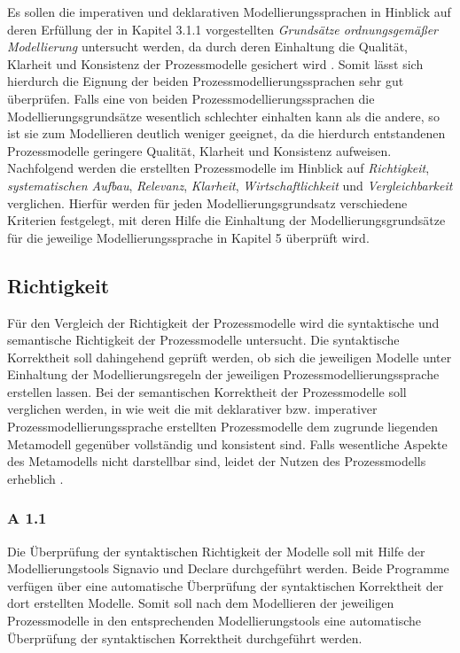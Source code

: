 Es sollen die imperativen und deklarativen Modellierungssprachen in Hinblick auf deren Erfüllung der in Kapitel 3.1.1 vorgestellten \textit{Grundsätze ordnungsgemäßer Modellierung} untersucht werden, da durch deren Einhaltung die Qualität, Klarheit und Konsistenz der Prozessmodelle gesichert wird \cite{freund2007}. Somit lässt sich hierdurch die Eignung der beiden Prozessmodellierungssprachen sehr gut überprüfen. Falls eine von beiden Prozessmodellierungssprachen die Modellierungsgrundsätze wesentlich schlechter einhalten kann als die andere, so ist sie zum Modellieren deutlich weniger geeignet, da die hierdurch entstandenen Prozessmodelle geringere Qualität, Klarheit und Konsistenz aufweisen. Nachfolgend werden die erstellten Prozessmodelle im Hinblick auf \textit{Richtigkeit}, \textit{systematischen Aufbau}, \textit{Relevanz}, \textit{Klarheit}, \textit{Wirtschaftlichkeit} und \textit{Vergleichbarkeit} verglichen. Hierfür werden für jeden Modellierungsgrundsatz verschiedene Kriterien festgelegt, mit deren Hilfe die Einhaltung der Modellierungsgrundsätze für die jeweilige Modellierungssprache in Kapitel 5 überprüft wird. \newline

\subsection{Richtigkeit}
Für den Vergleich der Richtigkeit der Prozessmodelle wird die syntaktische und semantische Richtigkeit der Prozessmodelle untersucht. Die syntaktische Korrektheit soll dahingehend geprüft werden, ob sich die jeweiligen Modelle unter Einhaltung der Modellierungsregeln der jeweiligen Prozessmodellierungssprache erstellen lassen. Bei der semantischen Korrektheit der Prozessmodelle soll verglichen werden, in wie weit die mit deklarativer bzw. imperativer Prozessmodellierungssprache erstellten Prozessmodelle dem zugrunde liegenden Metamodell gegenüber vollständig und konsistent sind. Falls wesentliche Aspekte des Metamodells nicht darstellbar sind, leidet der Nutzen des Prozessmodells erheblich \cite{journals95, freund2007, becker2012prozessmanagement,koch2011}.  \newline

\subsubsection{A 1.1}

Die Überprüfung der syntaktischen Richtigkeit der Modelle soll mit Hilfe der Modellierungstools Signavio und Declare durchgeführt werden. Beide Programme verfügen über eine automatische Überprüfung der syntaktischen Korrektheit der dort erstellten Modelle. Somit soll nach dem Modellieren der jeweiligen Prozessmodelle in den entsprechenden Modellierungstools eine automatische Überprüfung der syntaktischen Korrektheit durchgeführt werden. \newline


